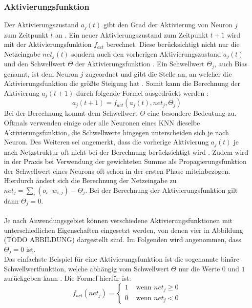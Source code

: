 \subsubsection{Aktivierungsfunktion}
Der Aktivierungszustand $a_j(t)$ gibt den Grad der Aktivierung von Neuron $j$ zum Zeitpunkt $t$ an \cite{zell2003simulation}. Ein neuer Aktivierungszustand zum Zeitpunkt $t+1$ wird mit der Aktivierungsfunktion $f_{act}$ berechnet. Diese berücksichtigt nicht nur die Netzeingabe $net_j(t)$ sondern auch den vorherigen Aktivierungszustand $a_j(t)$ und den Schwellwert $\Theta$ der Aktivierungsfunktion \cite{zell2003simulation}. Ein Schwellwert $\Theta_j$, auch Bias genannt, ist dem Neuron $j$ zugeordnet und gibt die Stelle an, an welcher die Aktivierungsfunktion die größte Steigung hat \cite{kriesel2008kleiner}. Somit kann die Berechnung der Aktivierung $a_j(t+1)$ durch folgende Formel ausgedrückt werden \cite{zell2003simulation}:
$$a_j(t+1)=f_{act}(a_j(t), net_j, \Theta_j)$$
Bei der Berechnung kommt dem Schwellwert $\Theta$ eine besondere Bedeutung zu. Oftmals verwenden einige oder alle Neuronen eines \ac{KNN} dieselbe Aktivierungsfunktion, die Schwellwerte hingegen unterscheiden sich je nach Neuron. Des Weiteren sei angemerkt, dass  die vorherige Aktivierung $a_j(t)$ je nach Netzstruktur oft nicht bei der Berechnung berücksichtigt wird \cite{kriesel2008kleiner}. Zudem wird in der Praxis bei Verwendung der gewichteten Summe als Propagierungsfunktion der Schwellwert eines Neurons oft schon in der ersten Phase miteinbezogen. Hierdurch ändert sich die Berechnung der Netzeingabe zu $net_j=\sum_{i}(o_{i} \cdot w_{i, j}) - \Theta_j$. Bei der Berechnung der Aktivierungsfunktion gilt dann $\Theta_j = 0$.
\\\\
Je nach Anwendungsgebiet können verschiedene Aktivierungsfunktionen mit unterschiedlichen Eigenschaften eingesetzt werden, von denen vier in Abbildung (TODO ABBILDUNG) dargestellt sind. Im Folgenden wird angenommen, dass $\Theta_j=0$ ist.\\
Das einfachste Beispiel für eine Aktivierungsfunktion ist die sogenannte binäre Schwellwertfunktion, welche abhängig vom Schwellwert $\Theta$ nur die Werte $0$ und $1$ zurückgeben kann \cite{kriesel2008kleiner}. Die Formel hierfür ist: 
$$
f_{act}(net_j)=\left\{\begin{array}{ll}
1 & \text { wenn } net_j \geq 0 \\
0 & \text { wenn } net_j < 0
\end{array}\right.
$$
